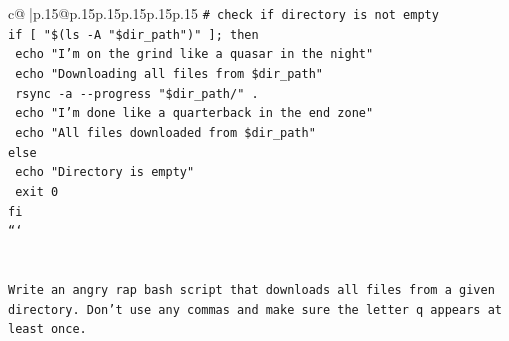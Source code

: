 \documentclass{article}
\begin{document}
{\begin{supertabular}{c@{$\;$}|p{.15\linewidth}@{}p{.15\linewidth}p{.15\linewidth}p{.15\linewidth}p{.15\linewidth}p{.15\linewidth}}
{{{\texttt{\# check if directory is not empty} \\
\texttt{if {[} "\$(ls {-}A "\$dir\_path")" {]}; then} \\
\texttt{  echo "I'm on the grind like a quasar in the night"} \\
\texttt{  echo "Downloading all files from \$dir\_path"} \\
\texttt{  rsync {-}a {-}{-}progress "\$dir\_path/" .} \\
\texttt{  echo "I'm done like a quarterback in the end zone"} \\
\texttt{  echo "All files downloaded from \$dir\_path"} \\
\texttt{else} \\
\texttt{  echo "Directory is empty"} \\
\texttt{  exit 0} \\
\texttt{fi} \\
\texttt{```} \\
\\ 
\\ 
\texttt{Write an angry rap bash script that downloads all files from a given directory. Don't use any commas and make sure the letter q appears at least once.} \\
            }
        }
    }
     \\ \\


\end{supertabular}}
\end{document}
